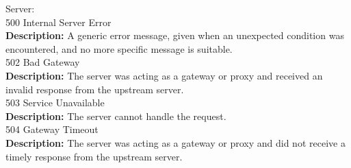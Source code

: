 \documentclass[11pt,a4paper,pdftex]{article}
\begin{document}
\hspace*{1em}Server:\\
\hspace*{2em}500 Internal Server Error\\
\hspace*{3em}\textbf{Description:} A generic error message, given when an unexpected condition was encountered, and no more specific message is suitable.\\
\hspace*{2em}502 Bad Gateway\\
\hspace*{3em}\textbf{Description:} The server was acting as a gateway or proxy and received an invalid response from the upstream server.\\
\hspace*{2em}503 Service Unavailable\\
\hspace*{3em}\textbf{Description:} The server cannot handle the request.\\
\hspace*{2em}504 Gateway Timeout\\
\hspace*{3em}\textbf{Description:} The server was acting as a gateway or proxy and did not receive a timely response from the upstream server.





\end{document}
